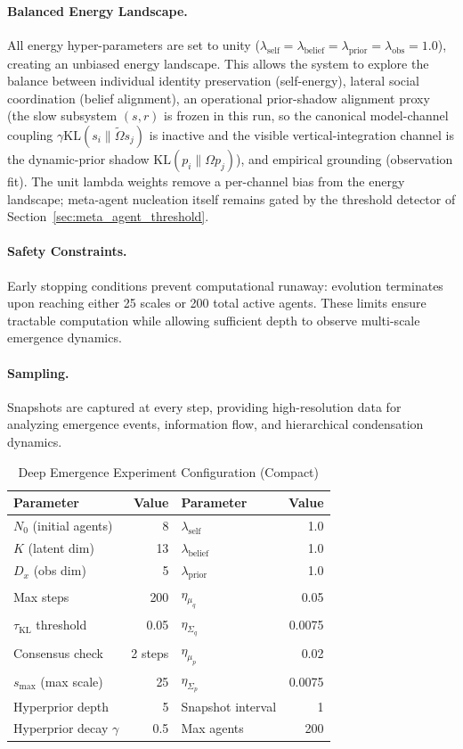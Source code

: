 \documentclass[11pt]{article}
\begin{document}
\paragraph{Balanced Energy Landscape.}
All energy hyper-parameters are set to unity ($\lambda_{\text{self}} = \lambda_{\text{belief}} = \lambda_{\text{prior}} = \lambda_{\text{obs}} = 1.0$), creating an unbiased energy landscape. This allows the system to explore the balance between individual identity preservation (self-energy), lateral social coordination (belief alignment), an operational prior-shadow alignment proxy (the slow subsystem $(s,r)$ is frozen in this run, so the canonical model-channel coupling $\gamma\mathrm{KL}(s_i\|\tilde\Omega s_j)$ is inactive and the visible vertical-integration channel is the dynamic-prior shadow $\mathrm{KL}(p_i\|\Omega p_j)$), and empirical grounding (observation fit). The unit lambda weights remove a per-channel bias from the energy landscape; meta-agent nucleation itself remains gated by the threshold detector of Section~\ref{sec:meta_agent_threshold}.

\paragraph{Safety Constraints.}
Early stopping conditions prevent computational runaway: evolution terminates upon reaching either 25 scales or 200 total active agents. These limits ensure tractable computation while allowing sufficient depth to observe multi-scale emergence dynamics.

\paragraph{Sampling.}
Snapshots are captured at every step, providing high-resolution data for analyzing emergence events, information flow, and hierarchical condensation dynamics.

\begin{table}[htbp]
\centering
\caption{Deep Emergence Experiment Configuration (Compact)}
\label{tab:deep_emergence_compact}
\small
\begin{tabular}{lr|lr}
\toprule
\textbf{Parameter} & \textbf{Value} & \textbf{Parameter} & \textbf{Value} \\
\midrule
$N_0$ (initial agents) & 8 & $\lambda_{\text{self}}$ & 1.0 \\
$K$ (latent dim) & 13 & $\lambda_{\text{belief}}$ & 1.0 \\
$D_x$ (obs dim) & 5 & $\lambda_{\text{prior}}$ & 1.0 \\
Max steps & 200 & $\eta_{\mu_q}$ & 0.05 \\
$\tau_{\mathrm{KL}}$ threshold & 0.05 & $\eta_{\Sigma_q}$ & 0.0075 \\
Consensus check & 2 steps & $\eta_{\mu_p}$ & 0.02 \\
$s_{\max}$ (max scale) & 25 & $\eta_{\Sigma_p}$ & 0.0075 \\
Hyperprior depth & 5 & Snapshot interval & 1 \\
Hyperprior decay $\gamma$ & 0.5 & Max agents & 200 \\
\bottomrule
\end{tabular}
\end{table}
\end{document}
